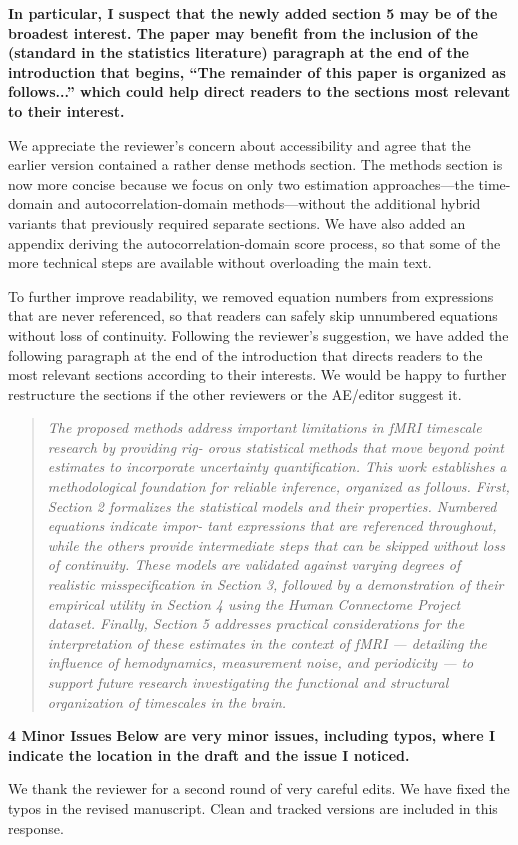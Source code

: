 \documentclass[docs/main.tex]{subfiles}
\newcommand{\reviewercomment}[1]{\vspace{0.3cm}\noindent\textbf{#1}\vspace{0.15cm}}
\newcommand{\manuscriptquote}[1]{\begin{quote}\textit{#1}\end{quote}}
\begin{document}
\reviewercomment{In particular, I suspect that the newly added section 5 may be of the broadest interest. The paper may benefit from the inclusion of the (standard in the statistics literature) paragraph at the end of the introduction that begins, ``The remainder of this paper is organized as follows...'' which could help direct readers to the sections most relevant to their interest.}

We appreciate the reviewer’s concern about accessibility and agree that the earlier version contained a rather dense methods section. The methods section is now more concise because we focus on only two estimation approaches---the time-domain and autocorrelation-domain methods---without the additional hybrid variants that previously required separate sections. We have also added an appendix deriving the autocorrelation-domain score process, so that some of the more technical steps are available without overloading the main text.

To further improve readability, we removed equation numbers from expressions that are never referenced, so that readers can safely skip unnumbered equations without loss of continuity. Following the reviewer’s suggestion, we have added the following paragraph at the end of the introduction that directs readers to the most relevant sections according to their interests. We would be happy to further restructure the sections if the other reviewers or the AE/editor suggest it.

\manuscriptquote{The proposed methods address important limitations in fMRI timescale research by providing rig-
orous statistical methods that move beyond point estimates to incorporate uncertainty quantification.
This work establishes a methodological foundation for reliable inference, organized as follows. First,
Section 2 formalizes the statistical models and their properties. Numbered equations indicate impor-
tant expressions that are referenced throughout, while the others provide intermediate steps that can
be skipped without loss of continuity. These models are validated against varying degrees of realistic
misspecification in Section 3, followed by a demonstration of their empirical utility in Section 4 using
the Human Connectome Project dataset. Finally, Section 5 addresses practical considerations for the
interpretation of these estimates in the context of fMRI --- detailing the influence of hemodynamics,
measurement noise, and periodicity --- to support future research investigating the functional and
structural organization of timescales in the brain.}

\textbf{4 Minor Issues}
\reviewercomment{Below are very minor issues, including typos, where I indicate the location in the draft and the issue I noticed.}

We thank the reviewer for a second round of very careful edits. We have fixed the typos in the revised manuscript. Clean and tracked versions are included in this response.
\end{document}
